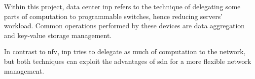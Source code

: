 Within this project, data center \gls{inp} refers to the technique of delegating some parts of computation to programmable switches, hence reducing servers' workload.
Common operations performed by these devices are data aggregation and key-value storage management.


In contrast to \gls{nfv}, \gls{inp} tries to delegate as much of computation to the network, but both techniques can exploit the advantages of \gls{sdn} for a more flexible network management.